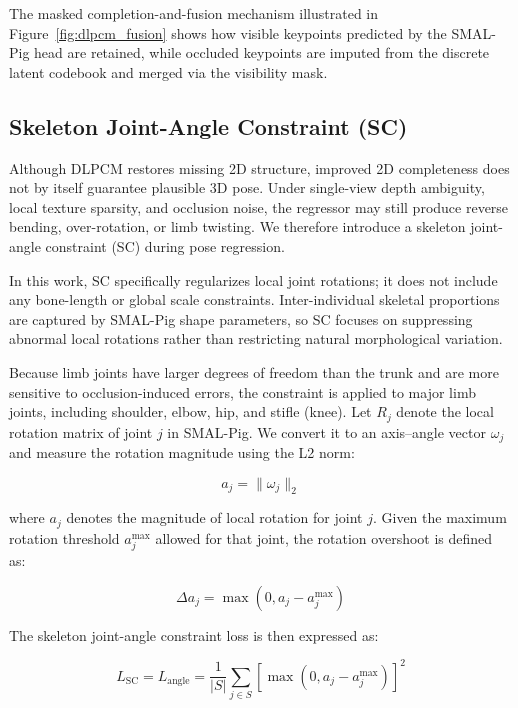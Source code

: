 \documentclass[computers,article,submit,pdftex,moreauthors]{mdpi}
\begin{document}
The masked completion-and-fusion mechanism illustrated in Figure~\ref{fig:dlpcm_fusion} shows how visible keypoints predicted by the SMAL-Pig head are retained, while occluded keypoints are imputed from the discrete latent codebook and merged via the visibility mask.

\subsection{Skeleton Joint-Angle Constraint (SC)}\label{sec:sc}

Although DLPCM restores missing 2D structure, improved 2D completeness does not by itself guarantee plausible 3D pose. Under single-view depth ambiguity, local texture sparsity, and occlusion noise, the regressor may still produce reverse bending, over-rotation, or limb twisting. We therefore introduce a skeleton joint-angle constraint (SC) during pose regression.

In this work, SC specifically regularizes local joint rotations; it does not include any bone-length or global scale constraints. Inter-individual skeletal proportions are captured by SMAL-Pig shape parameters, so SC focuses on suppressing abnormal local rotations rather than restricting natural morphological variation.

Because limb joints have larger degrees of freedom than the trunk and are more sensitive to occlusion-induced errors, the constraint is applied to major limb joints, including shoulder, elbow, hip, and stifle (knee). Let $R_j$ denote the local rotation matrix of joint $j$ in SMAL-Pig. We convert it to an axis--angle vector $\omega_j$ and measure the rotation magnitude using the L2 norm:

\begin{equation}
a_j = \|\omega_j\|_2
\end{equation}

where $a_j$ denotes the magnitude of local rotation for joint $j$. Given the maximum rotation threshold $a_j^{\max}$ allowed for that joint, the rotation overshoot is defined as:

\begin{equation}
\Delta a_j = \max(0, a_j - a_j^{\max})
\end{equation}

The skeleton joint-angle constraint loss is then expressed as:

\begin{equation}
L_{\text{SC}} = L_{\text{angle}} = \frac{1}{|S|} \sum_{j \in S} [\max(0, a_j - a_j^{\max})]^2
\end{equation}
\end{document}
